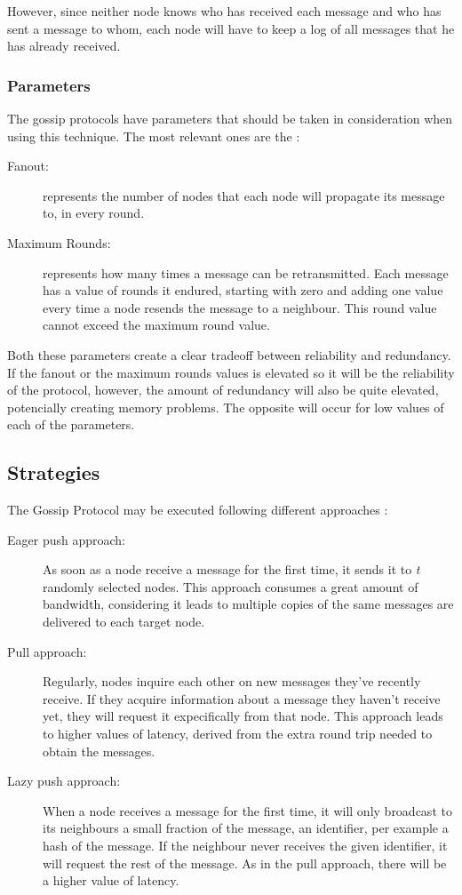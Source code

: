 However, since neither node knows who has received each message and who has sent a
message to whom, each node will have to keep a log of all messages that he has already
received.


\subsubsection{Parameters}
\label{subsubsec:gossip_parameters}
The gossip protocols have parameters that should be taken in consideration when using this
technique. The most relevant ones are the \cite{Leitao2012}:
\begin{description}
    \item[Fanout:] represents the number of nodes that each node will propagate its message to,
        in every round.
    \item[Maximum Rounds:] represents how many times a message can be retransmitted. Each message
        has a value of rounds it endured, starting with zero and adding one value every time a
        node resends the message to a neighbour. This round value cannot exceed the maximum
        round value.
\end{description}

Both these parameters create a clear tradeoff between reliability and redundancy. If the fanout
or the maximum rounds values is elevated so it will be the reliability of the protocol, however,
the amount of redundancy will also be quite elevated, potencially creating memory problems.
The opposite will occur for low values of each of the parameters.


\subsection{Strategies}
\label{subsec:gossip_strategies}
The Gossip Protocol may be executed following different approaches \cite{Karp2000}:
\begin{description}
    \item[Eager push approach:] As soon as a node receive a message for the first time,
        it sends it to \textit{t} randomly selected nodes. This approach consumes a great
        amount of bandwidth, considering it leads to multiple copies of the same messages
        are delivered to each target node.
    \item[Pull approach:] Regularly, nodes inquire each other on new messages they've
        recently receive. If they acquire information about a message they haven't receive
        yet, they will request it expecifically from that node. This approach leads to higher
        values of latency, derived from the extra round trip needed to obtain the messages.
    \item[Lazy push approach:] When a node receives a message for the first time, it will only
        broadcast to its neighbours a small fraction of the message, an identifier, per example
        a hash of the message. If the neighbour never receives the given identifier, it will request
        the rest of the message. As in the pull approach, there will be a higher value of latency.
\end{description}

